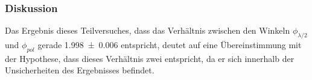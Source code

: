 	\subsubsection*{Diskussion}
	
		Das Ergebnis dieses Teilversuches, dass das Verhältnis zwischen den Winkeln $\phi_{\lambda/2}$ und $\phi_{pol}$ gerade \SI{1,998+-0,006}{} entspricht, deutet auf eine Übereinstimmung mit der Hypothese, dass dieses Verhältnis zwei entspricht, da er sich innerhalb der Unsicherheiten des Ergebnisses befindet.
